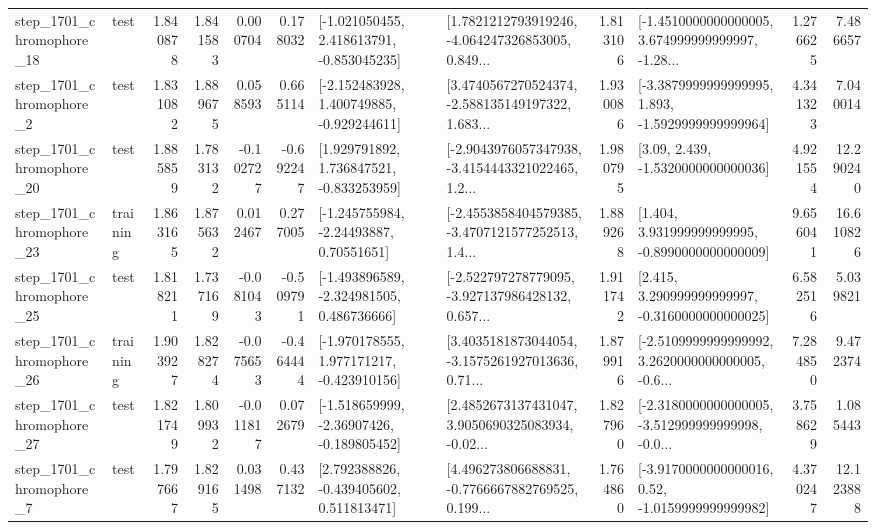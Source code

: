 \begin{tabular}{llrrrrllrlrr}
 step\_1701\_chromophore\_18 &      test &      1.840878 &    1.841583 &      0.000704 &  0.178032 &   [-1.021050455, 2.418613791, -0.853045235] &  [1.7821212793919246, -4.064247326853005, 0.849... &       1.813106 &  [-1.4510000000000005, 3.674999999999997, -1.28... &            1.276625 &          7.486657 \\
  step\_1701\_chromophore\_2 &      test &      1.831082 &    1.889675 &      0.058593 &  0.665114 &   [-2.152483928, 1.400749885, -0.929244611] &  [3.4740567270524374, -2.588135149197322, 1.683... &       1.930086 &  [-3.3879999999999995, 1.893, -1.5929999999999964] &            4.341323 &          7.040014 \\
 step\_1701\_chromophore\_20 &      test &      1.885859 &    1.783132 &     -0.102727 & -0.692247 &    [1.929791892, 1.736847521, -0.833253959] &  [-2.9043976057347938, -3.4154443321022465, 1.2... &       1.980795 &                 [3.09, 2.439, -1.5320000000000036] &            4.921554 &         12.290240 \\
 step\_1701\_chromophore\_23 &  training &      1.863165 &    1.875632 &      0.012467 &  0.277005 &     [-1.245755984, -2.24493887, 0.70551651] &  [-2.4553858404579385, -3.4707121577252513, 1.4... &       1.889268 &    [1.404, 3.931999999999995, -0.8990000000000009] &            9.656041 &         16.610826 \\
 step\_1701\_chromophore\_25 &      test &      1.818211 &    1.737169 &     -0.081043 & -0.509791 &   [-1.493896589, -2.324981505, 0.486736666] &  [-2.522797278779095, -3.927137986428132, 0.657... &       1.911742 &    [2.415, 3.290999999999997, -0.3160000000000025] &            6.582516 &          5.039821 \\
 step\_1701\_chromophore\_26 &  training &      1.903927 &    1.828274 &     -0.075653 & -0.464444 &   [-1.970178555, 1.977171217, -0.423910156] &  [3.4035181873044054, -3.1575261927013636, 0.71... &       1.879916 &  [-2.5109999999999992, 3.2620000000000005, -0.6... &            7.284850 &          9.472374 \\
 step\_1701\_chromophore\_27 &      test &      1.821749 &    1.809932 &     -0.011817 &  0.072679 &   [-1.518659999, -2.36907426, -0.189805452] &  [2.4852673137431047, 3.9050690325083934, -0.02... &       1.827960 &  [-2.3180000000000005, -3.512999999999998, -0.0... &            3.758629 &          1.085443 \\
  step\_1701\_chromophore\_7 &      test &      1.797667 &    1.829165 &      0.031498 &  0.437132 &    [2.792388826, -0.439405602, 0.511813471] &  [4.496273806688831, -0.7766667882769525, 0.199... &       1.764860 &   [-3.9170000000000016, 0.52, -1.0159999999999982] &            4.370247 &         12.123888 \\

\end{tabular}
